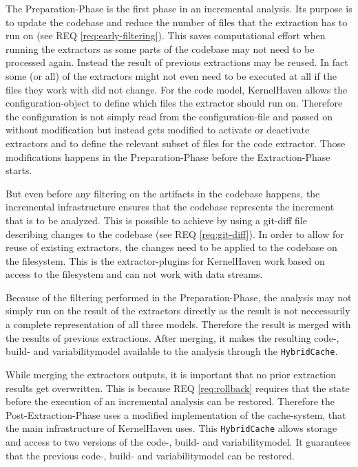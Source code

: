 \documentclass[a4paper]{article}
\begin{document}
The Preparation-Phase is the first phase in an incremental analysis. Its purpose is to update the codebase and reduce the number of files that the extraction has to run on (see REQ \ref{req:early-filtering}). This saves computational effort when running the extractors as some parts of the codebase  may not need to be processed again. Instead the result of previous extractions may be reused. In fact some (or all) of the extractors might not even need to be executed at all if the files they work with did not change. For the code model, KernelHaven allows the configuration-object to define which files the extractor should run on. 
 Therefore the configuration is not simply read from the configuration-file and passed on without modification but instead gets modified to activate or deactivate extractors and to define the relevant subset of files for the code extractor. Those modifications happens in the Preparation-Phase before the Extraction-Phase starts.

 But even before any filtering on the artifacts in the codebase happens, the incremental infrastructure ensures that the codebase represents the increment that is to be analyzed. This is possible to achieve by using a git-diff file describing changes to the codebase (see REQ \ref{req:git-diff}). In order to allow for reuse of existing extractors, the changes need to be applied to the codebase on the filesystem. This is the extractor-plugins for KernelHaven work based on access to the filesystem and can not work with data streams.

Because of the filtering performed in the Preparation-Phase, the analysis may not simply run on the result of the extractors directly as the result is not neccessarily a complete representation of all three models. Therefore the result is merged with the results of previous extractions. After merging, it makes the resulting code-, build- and variabilitymodel available to the analysis through the \texttt{Hybrid\-Cache}.

While merging the extractors outputs, it is important that no prior extraction results get overwritten. This is because REQ \ref{req:rollback} requires that the state before the execution of an incremental analysis can be restored. Therefore the Post-Extraction-Phase uses a modified implementation of the cache-system, that the main infrastructure of KernelHaven uses. This \texttt{Hybrid\-Cache} allows storage and access to two versions of the code-, build- and variabilitymodel. It guarantees that the previous code-, build- and variabilitymodel can be restored.
\end{document}
